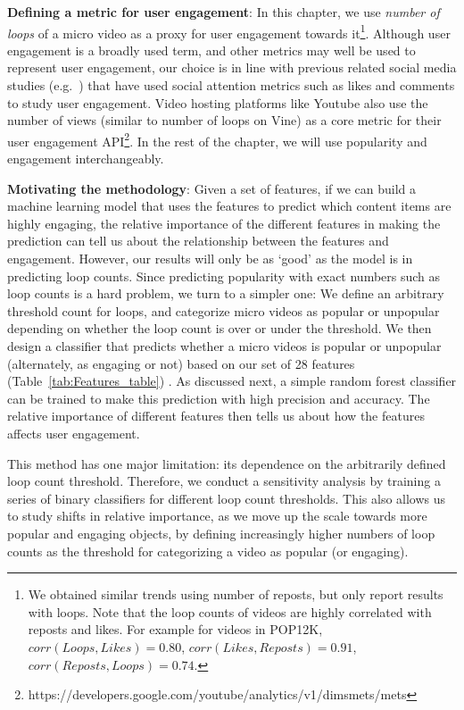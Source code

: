 \noindent\textbf{Defining a metric for user engagement}:  In this chapter, we  use \emph{number of loops} of a micro video as a proxy for user engagement towards it\footnote{We obtained similar trends using number of reposts, but only report results with loops. Note that the loop counts of videos are highly correlated with reposts and likes. For example for videos in POP12K, $ corr(Loops,Likes) = 0.80$, $corr(Likes,Reposts) = 0.91$, $corr(Reposts,Loops) = 0.74$.}.
Although user engagement is a broadly used term, and other metrics may well be used to represent user engagement, our choice is in line with previous related social media studies (e.g.~\cite{bakhshi2014faces})  that have used social attention metrics such as likes and comments to study user engagement. Video hosting platforms like Youtube also use the number of views (similar to number of loops on Vine) as a core metric for their user engagement API\footnote{\scriptsize https://developers.google.com/youtube/analytics/v1/dimsmets/mets}. In the rest of the chapter, we will use popularity and engagement interchangeably.

\noindent\textbf{Motivating the methodology}: 
Given a set of features, if we can build a machine learning model that uses the features to predict which content items are highly engaging, the relative importance of the different features in making the prediction can tell us about the relationship between the features and engagement. However, our results will only be as `good' as the model is in predicting loop counts. Since predicting popularity with exact numbers such as loop counts is a hard problem, we turn to a simpler one: We define an arbitrary threshold count for loops, and categorize micro videos as popular or unpopular depending on whether the loop count is over or under the threshold.  We then design a classifier that predicts whether a micro videos is popular or unpopular (alternately, as engaging or not) based on our set of 28 features (Table~\ref{tab:Features_table}) . As discussed next, a simple random forest classifier can be trained to make this prediction with high precision and accuracy. The relative importance of different features then tells us about how the features affects user engagement.

This method has one major limitation: its dependence on the arbitrarily defined loop count threshold. Therefore, we conduct a  sensitivity analysis by training a series of binary classifiers for different loop count thresholds. This also allows us to study shifts in relative importance, as we move up the scale towards more popular and engaging objects, by defining increasingly higher numbers of loop counts as the threshold for categorizing a video as popular (or engaging). 

